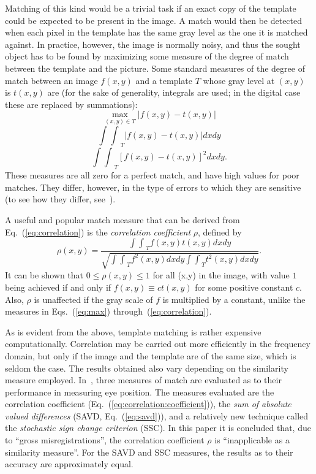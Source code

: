 Matching of this kind would be a trivial task if an exact copy of the
template could be expected to be present in the image.  A match would
then be detected when each pixel in the template has the same gray
level as the one it is matched against.  In practice, however, the
image is normally noisy, and thus the sought object has to be found by
maximizing some measure of the degree of match between the template
and the picture.  Some standard measures of the degree of match
between an image $f(x,y)$ and a template $T$ whose gray level at
$(x,y)$ is $t(x,y)$ are (for the sake of generality, integrals are
used; in the digital case these are replaced by summations):
\begin{equation}
\label{eq:max}
  \max_{(x,y)\in T}|f(x,y)-t(x,y)|
\end{equation}
\begin{equation}
\label{eq:savd}
  {\int\int}_{T}|f(x,y)-t(x,y)|dxdy
\end{equation}
\begin{equation}
\label{eq:correlation}
  {\int\int}_{T}[f(x,y)-t(x,y)]^{2}dxdy\mbox{.}
\end{equation}
These measures are all zero for a perfect match, and have high values
for poor matches.  They differ, however, in the type of errors to
which they are sensitive (to see how they differ, see~\cite{digpat}).

A useful and popular match measure that can be derived from
Eq.~(\ref{eq:correlation}) is the {\em correlation coefficient\/}
$\rho$, defined by
\begin{equation}
\label{eq:correlation:coefficient}
  \rho(x,y)=\frac{{\int\int}_{T}f(x,y)t(x,y)dxdy}
  {\sqrt{{\int\int}_{T}f^{2}(x,y)dxdy{\int\int}_{T}t^{2}(x,y)dxdy}}\mbox{.}
\end{equation}
It can be shown that $0\leq \rho(x,y)\leq 1$ for all (x,y) in the
image, with value $1$ being achieved if and only if $f(x,y)\equiv
ct(x,y)$ for some positive constant $c$.  Also, $\rho$ is unaffected
if the gray scale of $f$ is multiplied by a constant, unlike the
measures in Eqs.~(\ref{eq:max}) through~(\ref{eq:correlation}).

As is evident from the above, template matching is rather expensive
computationally.  Correlation may be carried out more efficiently in
the frequency domain, but only if the image and the template are of
the same size, which is seldom the case.  The results obtained also
vary depending on the similarity measure employed.
In~\cite{template}, three measures of match are evaluated as to their
performance in measuring eye position.  The measures evaluated are the
correlation coefficient (Eq.~(\ref{eq:correlation:coefficient})), the
{\em sum of absolute valued differences\/} (SAVD,
Eq.~(\ref{eq:savd})), and a relatively new technique called the {\em
  stochastic sign change criterion\/} (SSC).  In this paper it is
concluded that, due to ``gross misregistrations'', the correlation
coefficient $\rho$ is ``inapplicable as a similarity measure''.  For
the SAVD and SSC measures, the results as to their accuracy are
approximately equal.
